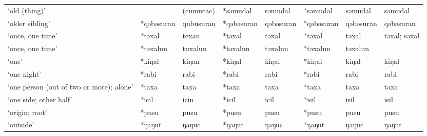 \begin{landscape}
\begin{longtable}[c]{@{}p{3cm}<{\raggedright}p{2.75cm}<{\raggedright}p{2.75cm}<{\raggedright}p{2.75cm}<{\raggedright}p{2.75cm}<{\raggedright}p{2.75cm}<{\raggedright}p{2.75cm}<{\raggedright}p{2.75cm}<{\raggedright}@{}}
`old (thing)'                                        &            & (cumucac)                        & *səmudal           & səmudal                    & *səmudal         & səmudal                  & səmudal                           \\
`older sibling'                                      & *qəbəsuran         & qubusuran                      & *qəbəsuran         & qəbəsuran                  & *qəbəsuran       & qəbəsuran                & qəbəsuran                         \\
`once, one time'                                     & *təxal             & texan                          & *təxal             & təxal                      & *təxal           & təxal                    & təxal; səxal                      \\
`once, one time'                                     & *təxalun           & tuxalun                        & *təxalun           & təxalun                    & *təxalun         & təxalun                  &                                   \\
`one'                                                & *kiŋal             & kiŋan                          & *kiŋal             & kiŋal                      & *kiŋal           & kiŋal                    & kiŋal                             \\
`one night'                                          & *rabi              & rabi                           & *rabi              & rabi                       & *rabi            & rabi                     & rabi                              \\
`one person (out of two or more); alone'             & *taxa              & taxa                           & *taxa              & taxa                       & *taxa            & taxa                     & taxa                              \\
`one side; other half'                               & *icil              & icin                           & *icil              & icil                       & *isil            & isil                     & isil                              \\
`origin; root'                                       & *pusu              & pusu                           & *pusu              & pusu                       & *pusu            & pusu                     & pusu                              \\
`outside'                                            & *ŋaŋut             & ŋaŋuc                          & *ŋaŋut             & ŋaŋuc                      & *ŋaŋut           & ŋaŋuc                    & ŋaŋut                             \\

\end{longtable}
\end{landscape}
